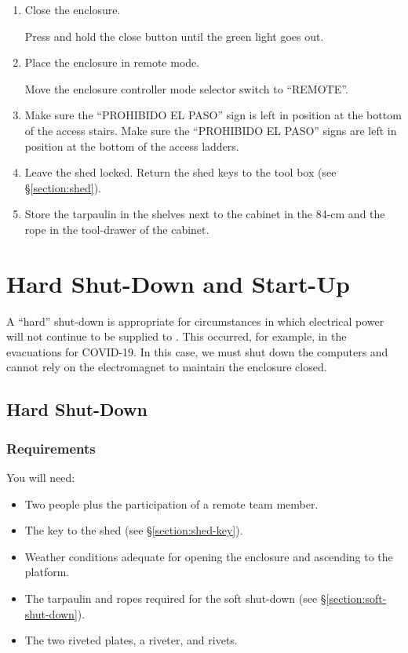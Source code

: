 \begin{enumerate}
\item Close the enclosure. 

Press and hold the close button until the green light goes out.

\item
Place the enclosure in remote mode.

Move the enclosure controller mode selector switch to “REMOTE”.

\item
\ifcoatlioan
Make sure the “PROHIBIDO EL PASO” sign is left in position at the bottom of the access stairs.
\fi
\ifddotioan
Make sure the “PROHIBIDO EL PASO” signs are left in position at the bottom of the access ladders.
\fi

\item
Leave the shed locked. Return the shed keys to the tool box (see \S\ref{section:shed}).

\item
Store the tarpaulin in the shelves next to the cabinet in the 84-cm and the rope in the tool-drawer of the cabinet.

\end{enumerate}

\section{Hard Shut-Down and Start-Up}

A “hard” shut-down is appropriate for circumstances in which electrical power will not continue to be supplied to {\projectname}. This occurred, for example, in the evacuations for COVID-19. In this case, we must shut down the computers and cannot rely on the electromagnet to maintain the enclosure closed.

\subsection{Hard Shut-Down}

\subsubsection{Requirements}

You will need:

\begin{itemize}
    \item Two people plus the participation of a remote team member.
    \item The key to the shed (see \S\ref{section:shed-key}).
    \item Weather conditions adequate for opening the enclosure and ascending to the platform.
    \item The tarpaulin and ropes required for the soft shut-down (see \S\ref{section:soft-shut-down}).
    \item The two riveted plates, a riveter, and rivets.
\end{itemize}

